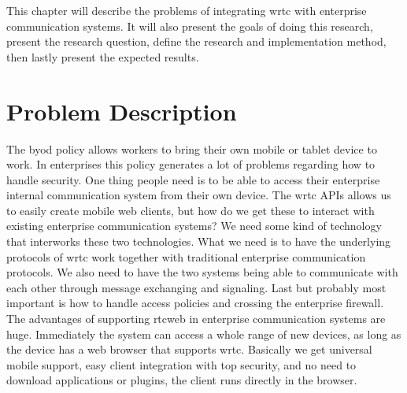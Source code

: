 
This chapter will describe the problems of integrating \gls{wrtc} with enterprise communication systems. It will also present the goals of doing this research, present the research question, define the research and implementation method, then lastly present the expected results.

\section{Problem Description}
The \gls{byod} policy allows workers to bring their own mobile or tablet device to work. In enterprises this policy generates a lot of problems regarding how to handle security. One thing people need is to be able to access their enterprise internal communication system from their own device. The \gls{wrtc} APIs allows us to easily create mobile web clients, but how do we get these to interact with existing enterprise communication systems? We need some kind of technology that interworks these two technologies. What we need is to have the underlying protocols of \gls{wrtc} work together with traditional enterprise communication protocols. We also need to have the two systems being able to communicate with each other through message exchanging and signaling. Last but probably most important is how to handle access policies and crossing the enterprise firewall. The advantages of supporting \gls{rtcweb} in enterprise communication systems are huge. Immediately the system can access a whole range of new devices, as long as the device has a web browser that supports \gls{wrtc}. Basically we get universal mobile support, easy client integration with top security, and no need to download applications or plugins, the client runs directly in the browser.





